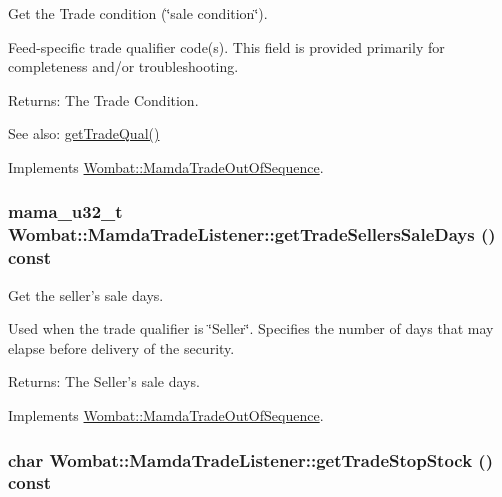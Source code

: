 Get the Trade condition (\char`\"{}sale condition\char`\"{}). 

Feed-specific trade qualifier code(s). This field is provided primarily for completeness and/or troubleshooting.

\begin{Desc}
\item[Returns:]The Trade Condition. \end{Desc}
\begin{Desc}
\item[See also:]\hyperlink{classWombat_1_1MamdaTradeListener_0f03f8d8b20f08eab587e439a939d0fc}{get\-Trade\-Qual()} \end{Desc}


Implements \hyperlink{classWombat_1_1MamdaTradeOutOfSequence_3364a708c76898275745e1f542d76bc7}{Wombat::Mamda\-Trade\-Out\-Of\-Sequence}.\hypertarget{classWombat_1_1MamdaTradeListener_719ed8fafd8f299b274ba2f11981b3ba}{
\subsubsection[getTradeSellersSaleDays]{\setlength{\rightskip}{0pt plus 5cm}mama\_\-u32\_\-t Wombat::Mamda\-Trade\-Listener::get\-Trade\-Sellers\-Sale\-Days () const}}
\label{classWombat_1_1MamdaTradeListener_719ed8fafd8f299b274ba2f11981b3ba}


Get the seller's sale days. 

Used when the trade qualifier is \char`\"{}Seller\char`\"{}. Specifies the number of days that may elapse before delivery of the security.

\begin{Desc}
\item[Returns:]The Seller's sale days. \end{Desc}


Implements \hyperlink{classWombat_1_1MamdaTradeOutOfSequence_c397454fff2397f0da68132f3eaec372}{Wombat::Mamda\-Trade\-Out\-Of\-Sequence}.\hypertarget{classWombat_1_1MamdaTradeListener_2d4333ba424d00cbda5e88a846ef3c8c}{
\subsubsection[getTradeStopStock]{\setlength{\rightskip}{0pt plus 5cm}char Wombat::Mamda\-Trade\-Listener::get\-Trade\-Stop\-Stock () const}}
\label{classWombat_1_1MamdaTradeListener_2d4333ba424d00cbda5e88a846ef3c8c}


